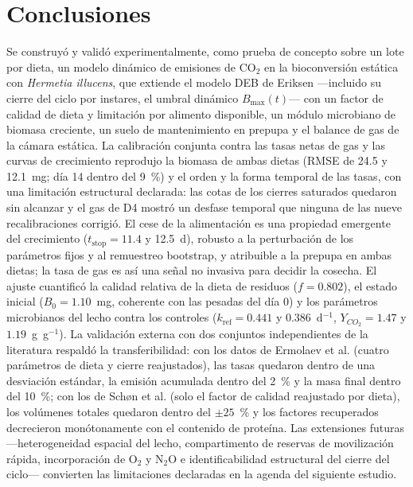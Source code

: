 \section{Conclusiones}
\label{sec:conclusiones}

Se construyó y validó experimentalmente, como prueba de concepto sobre un lote por dieta, un modelo dinámico de emisiones de CO$_2$ en la bioconversión estática con \textit{Hermetia illucens}, que extiende el modelo DEB de Eriksen ---incluido su cierre del ciclo por instares, el umbral dinámico $B_{\max}(t)$--- con un factor de calidad de dieta y limitación por alimento disponible, un módulo microbiano de biomasa creciente, un suelo de mantenimiento en prepupa y el balance de gas de la cámara estática. La calibración conjunta contra las tasas netas de gas y las curvas de crecimiento reprodujo la biomasa de ambas dietas (RMSE de 24.5 y 12.1~mg; día 14 dentro del 9~\%) y el orden y la forma temporal de las tasas, con una limitación estructural declarada: las cotas de los cierres saturados quedaron sin alcanzar y el gas de D4 mostró un desfase temporal que ninguna de las nueve recalibraciones corrigió. El cese de la alimentación es una propiedad emergente del crecimiento ($t_{\mathrm{stop}} = 11.4$ y 12.5~d), robusto a la perturbación de los parámetros fijos y al remuestreo bootstrap, y atribuible a la prepupa en ambas dietas; la tasa de gas es así una señal no invasiva para decidir la cosecha. El ajuste cuantificó la calidad relativa de la dieta de residuos ($f = 0.802$), el estado inicial ($B_0 = 1.10$~mg, coherente con las pesadas del día 0) y los parámetros microbianos del lecho contra los controles ($k_{\mathrm{ref}} = 0.441$ y $0.386$~d$^{-1}$, $Y_{CO_2} = 1.47$ y $1.19$~g~g$^{-1}$). La validación externa con dos conjuntos independientes de la literatura respaldó la transferibilidad: con los datos de Ermolaev et al. (cuatro parámetros de dieta y cierre reajustados), las tasas quedaron dentro de una desviación estándar, la emisión acumulada dentro del 2~\% y la masa final dentro del 10~\%; con los de Schøn et al. (solo el factor de calidad reajustado por dieta), los volúmenes totales quedaron dentro del $\pm 25$~\% y los factores recuperados decrecieron monótonamente con el contenido de proteína. Las extensiones futuras ---heterogeneidad espacial del lecho, compartimento de reservas de movilización rápida, incorporación de O$_2$ y N$_2$O e identificabilidad estructural del cierre del ciclo--- convierten las limitaciones declaradas en la agenda del siguiente estudio.
